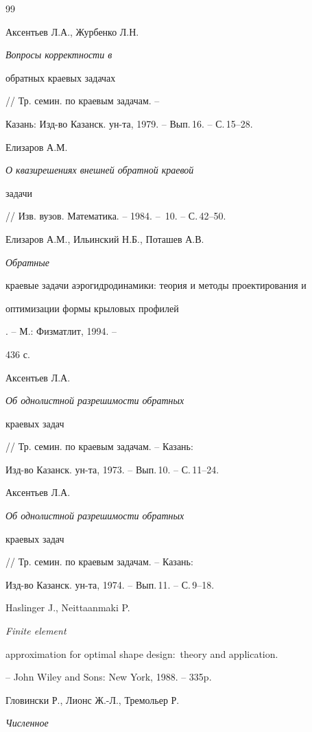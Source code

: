 \begin{thebibliography}{99}





 Аксентьев Л.А., Журбенко Л.Н. {\it Вопросы корректности в


обратных краевых задачах} // Тр. семин. по краевым задачам. --


Казань: Изд-во Казанск. ун-та, 1979. -- Вып.\,16. -- С.\,15--28.





 Елизаров А.М. {\it О квазирешениях внешней обратной краевой


задачи} // Изв. вузов. Математика. -- 1984. -- \No\,10. -- С.\,42--50.





 Елизаров А.М., Ильинский Н.Б., Поташев А.В. {\it Обратные


краевые задачи аэрогидродинамики: теория и методы проектирования и


оптимизации формы крыловых профилей}. -- М.: Физматлит, 1994. --


436 с.





 Аксентьев Л.А. {\it Об однолистной разрешимости обратных


краевых задач} // Тр. семин. по краевым задачам. -- Казань:


Изд-во Казанск. ун-та, 1973. -- Вып.\,10. -- С.\,11--24.





 Аксентьев Л.А. {\it Об однолистной разрешимости обратных


краевых задач} // Тр. семин. по краевым задачам. -- Казань:


Изд-во Казанск. ун-та, 1974. -- Вып.\,11. -- С.\,9--18.





 Haslinger J., Neittaanmaki P. {\it Finite element


approximation for optimal shape design${:}$ theory and application.}


-- John Wiley and Sons: New York, 1988. -- 335p.





 Гловински Р., Лионс Ж.-Л., Тремольер Р. {\it Численное


}
\end{thebibliography}
